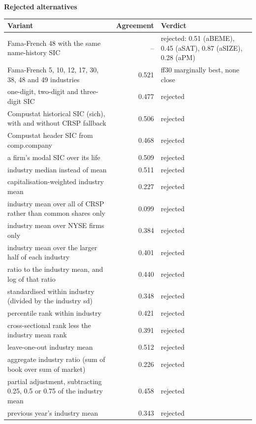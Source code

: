 \documentclass[11pt]{article}
\begin{document}
\textbf{Rejected alternatives}\\[2pt]
{\small\begin{longtable}{@{}p{9.6cm}rp{4.3cm}@{}}
\toprule Variant & Agreement & Verdict\\\midrule\endhead
Fama-French 48 with the same name-history SIC & -- & rejected: 0.51 (aBEME), 0.45 (aSAT), 0.87 (aSIZE), 0.28 (aPM)\\
Fama-French 5, 10, 12, 17, 30, 38, 48 and 49 industries & 0.521 & ff30 marginally best, none close\\
one-digit, two-digit and three-digit SIC & 0.477 & rejected\\
Compustat historical SIC (sich), with and without CRSP fallback & 0.506 & rejected\\
Compustat header SIC from comp.company & 0.468 & rejected\\
a firm's modal SIC over its life & 0.509 & rejected\\
industry median instead of mean & 0.511 & rejected\\
capitalisation-weighted industry mean & 0.227 & rejected\\
industry mean over all of CRSP rather than common shares only & 0.099 & rejected\\
industry mean over NYSE firms only & 0.384 & rejected\\
industry mean over the larger half of each industry & 0.401 & rejected\\
ratio to the industry mean, and log of that ratio & 0.440 & rejected\\
standardised within industry (divided by the industry sd) & 0.348 & rejected\\
percentile rank within industry & 0.421 & rejected\\
cross-sectional rank less the industry mean rank & 0.391 & rejected\\
leave-one-out industry mean & 0.512 & rejected\\
aggregate industry ratio (sum of book over sum of market) & 0.226 & rejected\\
partial adjustment, subtracting 0.25, 0.5 or 0.75 of the industry mean & 0.458 & rejected\\
previous year's industry mean & 0.343 & rejected\\
\bottomrule\end{longtable}}
\end{document}
